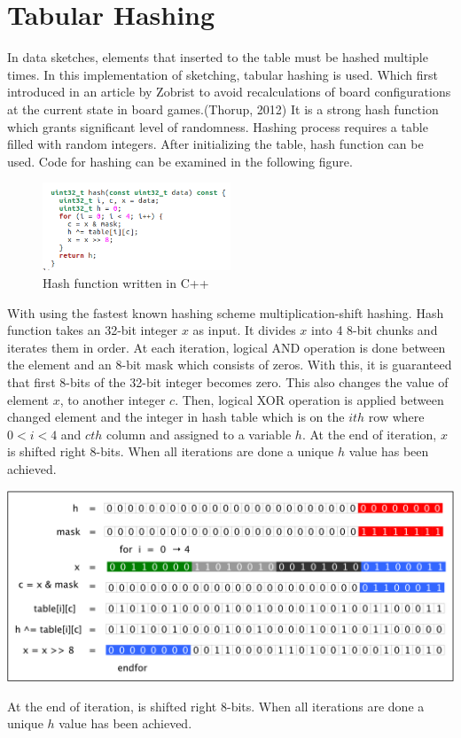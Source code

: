 \documentclass[twoside]{article}
\begin{document}
\section{Tabular Hashing}
In data sketches, elements that inserted to the  table must be hashed multiple times. In this implementation of sketching, tabular hashing is used. Which first introduced in an article by Zobrist to avoid recalculations of board configurations at the current state in board games.(Thorup, 2012) It is a  strong hash function which grants significant level of randomness. Hashing  process requires a table filled with random integers.  After  initializing the table, hash function can be used. Code for hashing can be
examined in the following figure.
\begin{figure}[H]
	\centering
\includegraphics[width=0.5\textwidth]{hashhh.png}
\caption{Hash function written in C++}
\label{fig:hash}
\end{figure}

With using the fastest known hashing scheme multiplication-shift hashing. Hash function takes an 32-bit integer $x$ as input. It divides $x$ into 4 8-bit chunks and iterates them in order. At each iteration, logical AND operation is done between the element and an 8-bit mask which consists of zeros.
With this, it is guaranteed that first 8-bits of the 32-bit integer becomes zero. This also changes the value of element $x$, to another integer $c$. Then, logical XOR operation is applied between changed element and the integer in hash table which is on the $ith$ row where $0<i<4$ and $cth$ column and assigned to a variable $h$. At the end of iteration, $x$ is shifted right 8-bits. When all iterations are done a unique $h$ value has been achieved.

\begin{center}
	\includegraphics[width=\linewidth]{tabularHash}
	\label{GIMlatlon}
\end{center}
At the end of iteration,  is shifted right 8-bits. When all iterations are done a unique $h$ value has been achieved. 
\end{document}
